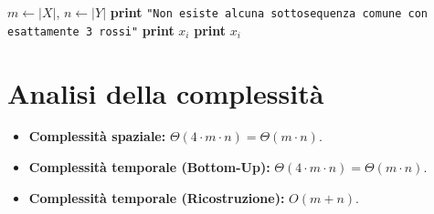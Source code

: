 \begin{algorithm}[htbp]
\caption{Ricostruzione della sequenza LCS con esattamente 3 rossi}
\begin{algorithmic}[1]
    \State $m \gets |X|$, $n \gets |Y|$
        \State \textbf{print} \texttt{"Non esiste alcuna sottosequenza comune con esattamente 3 rossi"}
    \Else
        \State {}
    \EndIf
\EndProcedure
\Statex
{}
        \State \Return
    \Else
                \State {}
            \Else
                \State {}
            \EndIf
        \Else
                \State {}
                \State \textbf{print} $x_i$
            \Else
                    \State {}
                \Else
                        \State {}
                        \State \textbf{print} $x_i$
                    \Else
                        \State {}
                    \EndIf
                \EndIf
            \EndIf
        \EndIf
    \EndIf
\EndProcedure
\end{algorithmic}
\end{algorithm}

\section{Analisi della complessità}
\begin{itemize}
    \item \textbf{Complessità spaziale:} $\Theta(4 \cdot m \cdot n) = \Theta(m \cdot n)$.
    \item \textbf{Complessità temporale (Bottom-Up):} $\Theta(4 \cdot m \cdot n) = \Theta(m \cdot n)$.
    \item \textbf{Complessità temporale (Ricostruzione):} $O(m + n)$.
\end{itemize}